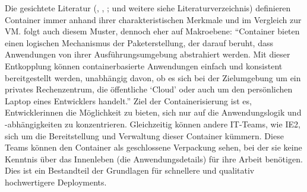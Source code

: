 Die gesichtete Literatur (\cite{pahl_containerization_2015}, \cite{bernstein_containers_2014}, \cite{kharb_automated_2016}; \cite{combe_docker_2016} und weitere siehe Literaturverzeichnis) definieren Container immer anhand ihrer charakteristischen Merkmale und im Vergleich zur \ac{VM}. \cite{google_ireland_limited_container_2020} folgt auch diesem Muster, dennoch eher auf Makroebene: \enquote{Container bieten einen logischen Mechanismus der Paketerstellung, der darauf beruht, dass Anwendungen von ihrer Ausführungsumgebung abstrahiert werden. Mit dieser Entkopplung können containerbasierte Anwendungen einfach und konsistent bereitgestellt werden, unabhängig davon, ob es sich bei der Zielumgebung um ein privates Rechenzentrum, die öffentliche \enquote{Cloud} oder auch um den persönlichen Laptop eines Entwicklers handelt.}\autocite[][]{google_ireland_limited_container_2020} Ziel der Containerisierung ist es, Entwicklerinnen die Möglichkeit zu bieten, sich nur auf die Anwendungslogik und -abhängigkeiten zu konzentrieren. Gleichzeitig können andere IT-Teams, wie \ac{IE2}, sich um die Bereitstellung und Verwaltung dieser Container kümmern. Diese Teams können den Container als geschlossene Verpackung sehen, bei der sie keine Kenntnis über das Innenleben (die Anwendungsdetails) für ihre Arbeit benötigen.\autocite[vgl.][]{google_ireland_limited_container_2020} Dies ist ein Bestandteil der Grundlagen für schnellere und qualitativ hochwertigere Deployments.\autocite[vgl.][S.\,1]{kharb_automated_2016} \par
